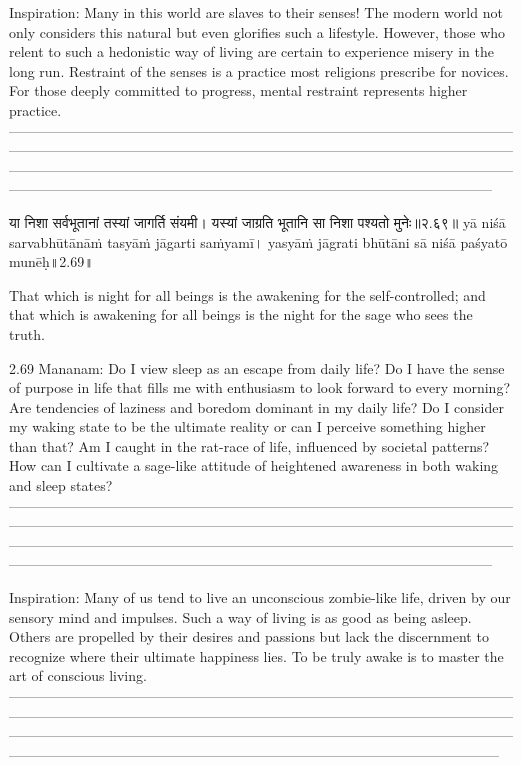 Inspiration: 
Many in this world are slaves to their senses! The modern world not only considers this natural but even glorifies such a lifestyle. However, those who relent to such a hedonistic way of living are certain to experience misery in the long run. Restraint of the senses is a practice most religions prescribe for novices. For those deeply committed to progress, mental restraint represents higher practice.
—-----------------------------------------------------------------------------------------------------------------------------------------------------------------------------------------------------------------------------------------------------------------------------------------------------------------------------------------------------------------------------------------------------------------------------------------


या निशा सर्वभूतानां तस्यां जागर्ति संयमी। 
यस्यां जाग्रति भूतानि सा निशा पश्यतो मुनेः॥२.६९॥
yā niśā sarvabhūtānāṁ tasyāṁ jāgarti saṁyamī। 
yasyāṁ jāgrati bhūtāni sā niśā paśyatō munēḥ॥2.69॥

That which is night for all beings is the awakening for the self-controlled; and that which is awakening for all beings is the night for the sage who sees the truth.

2.69 Mananam:
Do I view sleep as an escape from daily life? Do I have the sense of purpose in life that fills me with enthusiasm to look forward to every morning? Are tendencies of laziness and boredom dominant in my daily life?
Do I consider my waking state to be the ultimate reality or can I perceive something higher than that? Am I caught in the rat-race of life, influenced by societal patterns? How can I cultivate a sage-like attitude of heightened awareness in both waking and sleep states?
—-----------------------------------------------------------------------------------------------------------------------------------------------------------------------------------------------------------------------------------------------------------------------------------------------------------------------------------------------------------------------------------------------------------------------------------------
 
Inspiration:
Many of us tend to live an unconscious zombie-like life, driven by our sensory mind and impulses. Such a way of living is as good as being asleep. Others are propelled by their desires and passions but lack the discernment to recognize where their ultimate happiness lies. To be truly awake is to master the art of conscious living.
—------------------------------------------------------------------------------------------------------------------------------------------------------------------------------------------------------------------------------------------------------------------------------------------------------------------------------------------------------------------------------------------------------------------------------------------

